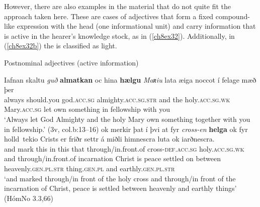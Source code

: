 \documentclass[output=paper,colorlinks,citecolor=brown]{langscibook}
\begin{document}
However, there are also examples in the  material that do not
quite fit the approach taken here. These are cases of 
adjectives that form a fixed compound-like expression with the head
 (one informational unit) and carry information that is active in
the hearer's knowledge stock, as in (\ref{ch8ex32}). Additionally, in (\ref{ch8ex32b}) the
 is classified as light.

\begin{exe}
\ex\label{ch8ex32}Postnominal adjectives (active information)
\begin{xlist}
\ex\label{ch8ex32a}
\gll  Iafnan skaltu \textit{guð} \textbf{almatkan} oc hina \textbf{hælgu} \textit{Maʀiu} lata æiga noccot í felage mæð þer \\
always should.you god.\textsc{acc.sg} almighty.\textsc{acc.sg.str} and the holy.\textsc{acc.sg.wk} Mary.\textsc{acc.sg} let own something in fellowship with you\\
\glt `Always let God Almighty and the holy Mary own something together with
you in fellowship.' (3v, col.b:13--16)
\ex\label{ch8ex32b}
\gll ok merkir þat í þvi at fyr \textit{cross-en} \textbf{helga} ok fyr holld~tekio Crists er friðr settr á miðli himnescra luta ok iarðnescra. \\
and mark this in this that through/in.front.of cross-\textsc{def.acc.sg} holy.\textsc{acc.sg.wk} and through/in.front.of incarnation Christ is peace settled on between heavenly.\textsc{gen.pl.str} thing.\textsc{gen.pl} and earthly.\textsc{gen.pl.str}\\
\glt `and marked through/in front of the holy cross and through/in front of the incarnation of Christ, peace is settled between heavenly and earthly things' (HómNo 3.3,66)
\end{xlist}
\end{exe}
\end{document}
